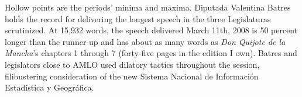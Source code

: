 \documentclass[letter,12pt]{article}
\begin{document}

Hollow points are the periods' minima and maxima. Diputada Valentina Batres holds the record for delivering the longest speech in the three Legislaturas scrutinized. At 15,932 words, the speech delivered March 11th, 2008 is 50 percent longer than the runner-up and has about as many words as \emph{Don Quijote de la Mancha}'s chapters 1 through 7 (forty-five pages in the edition I own). Batres and legislators close to AMLO used dilatory tactics throughout the session, filibustering consideration of the new Sistema Nacional de Información Estadística y Geográfica. 
  
\end{document}
